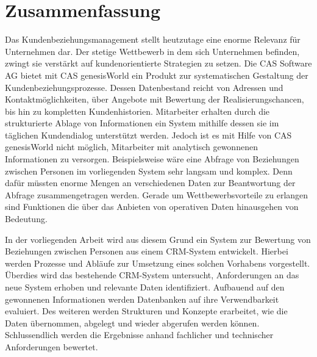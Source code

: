 
\chapter*{\centering Zusammenfassung}


Das Kundenbeziehungsmanagement stellt heutzutage eine enorme Relevanz für Unternehmen dar. Der stetige Wettbewerb in dem sich Unternehmen
befinden, zwingt sie verstärkt auf kundenorientierte Strategien zu setzen. Die CAS Software AG bietet mit CAS genesisWorld ein Produkt zur systematischen Gestaltung der Kundenbeziehungsprozesse. Dessen Datenbestand reicht von Adressen und Kontaktmöglichkeiten, über Angebote mit Bewertung der Realisierungschancen, bis hin zu kompletten Kundenhistorien. Mitarbeiter erhalten durch die strukturierte Ablage von Informationen ein System mithilfe dessen sie im täglichen Kundendialog unterstützt werden. Jedoch ist es mit Hilfe von CAS genesisWorld nicht möglich, Mitarbeiter mit analytisch gewonnenen Informationen zu versorgen. Beispielsweise wäre eine Abfrage von Beziehungen zwischen Personen im vorliegenden System sehr langsam und komplex. Denn dafür müssten enorme Mengen an verschiedenen Daten zur Beantwortung der Abfrage zusammengetragen werden. Gerade um Wettbewerbsvorteile zu erlangen sind Funktionen die über das Anbieten von operativen Daten hinausgehen von Bedeutung.      

In der vorliegenden Arbeit wird aus diesem Grund ein System zur Bewertung von Beziehungen zwischen Personen aus einem CRM-System entwickelt. Hierbei werden Prozesse und Abläufe zur Umsetzung eines solchen Vorhabens vorgestellt. Überdies wird das bestehende CRM-System untersucht, Anforderungen an das neue System erhoben und relevante Daten identifiziert. Aufbauend auf den gewonnenen Informationen werden Datenbanken auf ihre Verwendbarkeit evaluiert. Des weiteren werden Strukturen und Konzepte erarbeitet, wie die Daten übernommen, abgelegt und wieder abgerufen werden können. Schlussendlich werden die Ergebnisse anhand fachlicher und technischer Anforderungen bewertet.